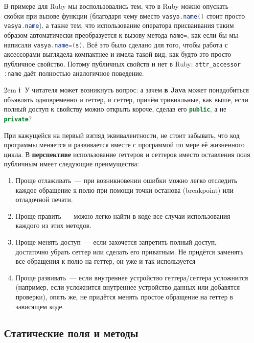 \documentclass[a4paper, 14pt, titlepage]{extarticle}
\newcommand{\strong}[1]{\textbf{#1}}
\newenvironment{indented}%
    { \begingroup %
        \noindent %
        \leftskip2em %
        \rightskip\leftskip }%
    { \par\endgroup }
\newenvironment{extrainfo}%
    { \begin{indented} %
        \color{dkblue} %
        \small %
        \textbf{\textcircled{\footnotesize i}} }%
    { \end{indented} }
\newcommand{\inlinecode}[2][Java]{\lstinline[basicstyle=\ttfamily, language=#1]{#2}}
\begin{document}
  В примере для Ruby мы воспользовались тем, что в Ruby можно опускать скобки при вызове функции
  (благодаря чему вместо \inlinecode{vasya.name()} стоит просто \inlinecode{vasya.name}), а также
  тем, что использование оператора присваивания таким образом автоматически преобразуется к вызову
  метода \inlinecode{name=}, как если бы мы написали \inlinecode{vasya.name=(s)}. Всё это было
  сделано для того, чтобы работа с аксессорами выглядела компактнее и имела такой вид, как будто это
  просто публичное свойство. Потому публичных свойств и нет в Ruby: \inlinecode{attr_accessor :name}
  даёт полностью аналогичное поведение.

  \begin{extrainfo}
    У читателя может возникнуть вопрос: а зачем \strong{в Java} может понадобиться объявлять одновременно и
    геттер, и сеттер, причём тривиальные, как выше, если полный доступ к свойству можно открыть короче,
    сделав его \inlinecode{public}, а не \inlinecode{private}?

    При кажущейся на первый взгляд эквивалентности, не стоит забывать, что код программы меняется и
    развивается вместе с программой по мере её жизненного цикла. В \strong{перспективе}
    использование геттеров и сеттеров вместо оставления поля публичным имеет следующие преимущества:

    \begin{enumerate}
      \item Проще отлаживать~--- при возникновении ошибки можно легко отследить каждое обращение к
            полю при помощи точки останова (breakpoint) или отладочной печати.
      \item Проще править~--- можно легко найти в коде все случаи использования каждого из этих методов.
      \item Проще менять доступ~--- если захочется запретить полный доступ, достаточно убрать сеттер
            или сделать его приватным. Не придётся заменять все обращения к полю на геттер, он уже и
            так используется
      \item Проще развивать~--- если внутреннее устройство геттера/сеттера усложнится (например,
            если усложнится внутреннее устройство данных или добавятся проверки), опять же, не
            придётся менять простое обращение на геттер в зависящем коде.
    \end{enumerate}
  \end{extrainfo}

  \subsection{Статические поля и методы}
\end{document}
